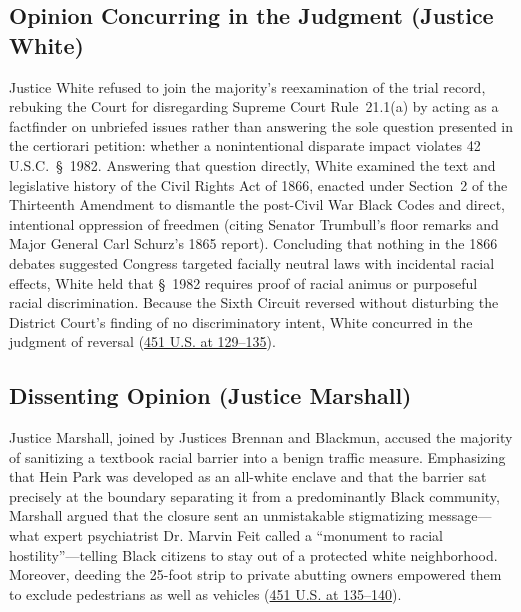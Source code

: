 \documentclass[12pt]{article}
\begin{document}
\subsection{Opinion Concurring in the Judgment (Justice White)}

Justice White refused to join the majority's reexamination of the trial record, rebuking the Court for disregarding Supreme Court Rule~21.1(a) by acting as a factfinder on unbriefed issues rather than answering the sole question presented in the certiorari petition: whether a nonintentional disparate impact violates 42 U.S.C.\ \S~1982. Answering that question directly, White examined the text and legislative history of the Civil Rights Act of 1866, enacted under Section~2 of the Thirteenth Amendment to dismantle the post-Civil War Black Codes and direct, intentional oppression of freedmen (citing Senator Trumbull's floor remarks and Major General Carl Schurz's 1865 report). Concluding that nothing in the 1866 debates suggested Congress targeted facially neutral laws with incidental racial effects, White held that \S~1982 requires proof of racial animus or purposeful racial discrimination. Because the Sixth Circuit reversed without disturbing the District Court's finding of no discriminatory intent, White concurred in the judgment of reversal (\href{https://supreme.justia.com/cases/federal/us/451/100/}{451 U.S. at 129--135}).

\subsection{Dissenting Opinion (Justice Marshall)}

Justice Marshall, joined by Justices Brennan and Blackmun, accused the majority of sanitizing a textbook racial barrier into a benign traffic measure. Emphasizing that Hein Park was developed as an all-white enclave and that the barrier sat precisely at the boundary separating it from a predominantly Black community, Marshall argued that the closure sent an unmistakable stigmatizing message---what expert psychiatrist Dr. Marvin Feit called a ``monument to racial hostility''---telling Black citizens to stay out of a protected white neighborhood. Moreover, deeding the 25-foot strip to private abutting owners empowered them to exclude pedestrians as well as vehicles (\href{https://supreme.justia.com/cases/federal/us/451/100/}{451 U.S. at 135--140}).
\end{document}
